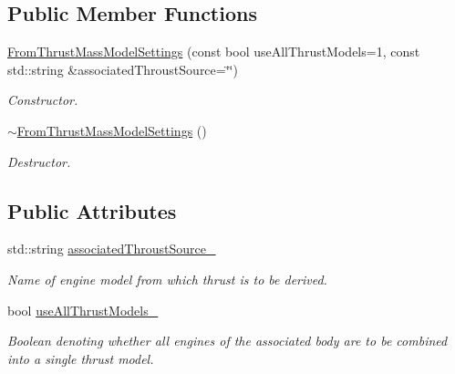 \subsection*{Public Member Functions}
\begin{DoxyCompactItemize}
\item 
\hyperlink{classtudat_1_1simulation__setup_1_1FromThrustMassModelSettings_aa23bd0f877a3cb7eac6a26082f0d3e26}{From\+Thrust\+Mass\+Model\+Settings} (const bool use\+All\+Thrust\+Models=1, const std\+::string \&associated\+Throust\+Source=\char`\"{}\char`\"{})
\begin{DoxyCompactList}\small\item\em Constructor. \end{DoxyCompactList}\item 
\hyperlink{classtudat_1_1simulation__setup_1_1FromThrustMassModelSettings_af505d48a2053b6135bfc9bb0ebbfa9b6}{$\sim$\+From\+Thrust\+Mass\+Model\+Settings} ()\hypertarget{classtudat_1_1simulation__setup_1_1FromThrustMassModelSettings_af505d48a2053b6135bfc9bb0ebbfa9b6}{}\label{classtudat_1_1simulation__setup_1_1FromThrustMassModelSettings_af505d48a2053b6135bfc9bb0ebbfa9b6}

\begin{DoxyCompactList}\small\item\em Destructor. \end{DoxyCompactList}\end{DoxyCompactItemize}
\subsection*{Public Attributes}
\begin{DoxyCompactItemize}
\item 
std\+::string \hyperlink{classtudat_1_1simulation__setup_1_1FromThrustMassModelSettings_af55c910dfb5ae91fee7bfc9b9bbd9246}{associated\+Throust\+Source\+\_\+}\hypertarget{classtudat_1_1simulation__setup_1_1FromThrustMassModelSettings_af55c910dfb5ae91fee7bfc9b9bbd9246}{}\label{classtudat_1_1simulation__setup_1_1FromThrustMassModelSettings_af55c910dfb5ae91fee7bfc9b9bbd9246}

\begin{DoxyCompactList}\small\item\em Name of engine model from which thrust is to be derived. \end{DoxyCompactList}\item 
bool \hyperlink{classtudat_1_1simulation__setup_1_1FromThrustMassModelSettings_a2cf4e18d8228de3f3f62495a944e48de}{use\+All\+Thrust\+Models\+\_\+}\hypertarget{classtudat_1_1simulation__setup_1_1FromThrustMassModelSettings_a2cf4e18d8228de3f3f62495a944e48de}{}\label{classtudat_1_1simulation__setup_1_1FromThrustMassModelSettings_a2cf4e18d8228de3f3f62495a944e48de}

\begin{DoxyCompactList}\small\item\em Boolean denoting whether all engines of the associated body are to be combined into a single thrust model. \end{DoxyCompactList}\end{DoxyCompactItemize}


